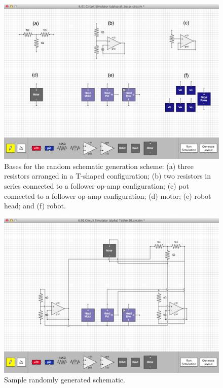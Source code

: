 \begin{figure}[H]
\begin{center}
\includegraphics[width=\textwidth]{Images/auto_generation_bases.png}
\caption[Random schematic generation bases]{Bases for the random schematic
generation scheme:
(a) three resistors arranged in a T-shaped configuration;
(b) two resistors in series connected to a follower op-amp configuration;
(c) pot connected to a follower op-amp configuration;
(d) motor;
(e) robot head; and
(f) robot.}
\label{fig:random_gen_bases}
\end{center}
\end{figure}

\begin{figure}[H]
\begin{center}
\includegraphics[width=\textwidth]{Images/auto_generation_example.png}
\caption[Sample randomly generated schematic]{Sample randomly generated
schematic.}
\label{fig:example_random_schematic}
\end{center}
\end{figure}

